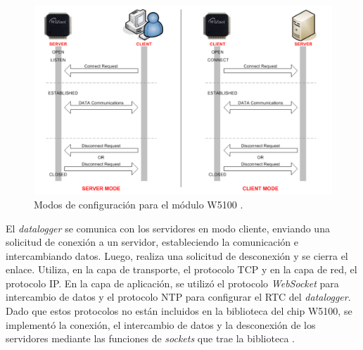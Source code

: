\begin{figure}[H]
    \centering
    \includegraphics[width=0.9\linewidth]{Figuras/datalogger/Firmware/socketModoDeTrabajoW5100.png}
    \caption{Modos de configuración para el módulo W5100 \cite{W5100Datasheet}.}
    \label{fig:socketModoDeTrabajoW5100}
\end{figure}

El \textit{datalogger} se comunica con los servidores en modo cliente, enviando una solicitud de conexión a un servidor, estableciendo la comunicación e intercambiando datos. Luego, realiza una solicitud de desconexión y se cierra el enlace. Utiliza, en la capa de transporte, el protocolo TCP y en la capa de red, el protocolo IP. En la capa de aplicación, se utilizó el protocolo \textit{WebSocket} para intercambio de datos y el protocolo NTP para configurar el RTC del \textit{datalogger}. Dado que estos protocolos no están incluidos en la biblioteca del chip W5100, se implementó la conexión, el intercambio de datos y la desconexión de los servidores mediante las funciones de \textit{sockets} que trae la biblioteca \cite{wiznet2024}.


